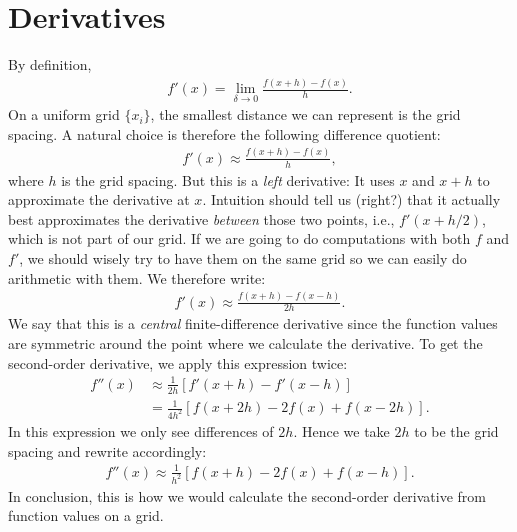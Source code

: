 \documentclass{article}
\begin{document}
\section{Derivatives}
By definition,
\begin{align}
  f'(x) = \lim_{\delta\rightarrow 0} \frac{f(x + h) - f(x)}{h}.
\end{align}
On a uniform grid $\{x_i\}$, the smallest distance we can represent is the grid
spacing.  A natural choice is therefore the following difference quotient:
\begin{align}
  f'(x) \approx \frac{f(x + h) - f(x)}{h},
\end{align}
where $h$ is the grid spacing.
But this is a \emph{left} derivative: It uses $x$ and $x + h$ to
approximate the derivative at $x$.  Intuition should tell us (right?) that
it actually best approximates the derivative \emph{between} those two points,
i.e., $f'(x + h/2)$, which is not part of our grid.
If we are going to do computations with both $f$ and $f'$, we should wisely
try to have them on the same grid so we can easily do arithmetic with them.
We therefore write:
\begin{align}
  f'(x) \approx \frac{f(x + h) - f(x - h)}{2h}.
\end{align}
We say that this is a \emph{central} finite-difference
derivative since the function values are symmetric around the point where we
calculate the derivative.
To get the second-order derivative, we apply this expression twice:
\begin{align}
  f''(x) &\approx \frac{1}{2h} \left[f'(x + h) - f'(x - h) \right] \nonumber\\
  &= \frac{1}{4h^2} \left[
  f(x + 2 h) - 2 f(x) + f(x - 2 h)
  \right].
\end{align}
In this expression we only see differences of $2h$.   Hence we take $2h$ to
be the grid spacing and rewrite accordingly:
\begin{align}
  f''(x) \approx \frac{1}{h^2}\left[f(x + h) - 2 f(x) + f(x - h)\right].
\end{align}
In conclusion, this is how we would calculate the second-order
derivative from function values on a grid.
\end{document}
